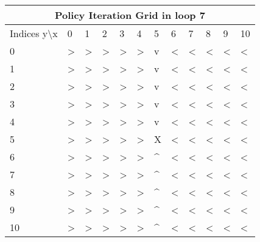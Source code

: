 \documentclass{article}
\begin{document}
\begin{center}
\begin{tabular}{ |l | l | l | l | l | l | l | l | l | l | l | l|}
\hline
\multicolumn{12}{|c|}{Policy Iteration Grid in loop 7}\\
\hline
Indices y\textbackslash x &0 & 1 & 2 & 3 & 4 & 5 & 6 & 7 & 8 & 9 & 10 \\ 

\hline
0 & \textgreater & \textgreater & \textgreater & \textgreater & \textgreater & v & \textless & \textless & \textless & \textless & \textless\\
1 & \textgreater & \textgreater & \textgreater & \textgreater & \textgreater & v & \textless & \textless & \textless & \textless & \textless\\
2 & \textgreater & \textgreater & \textgreater & \textgreater & \textgreater & v & \textless & \textless & \textless & \textless & \textless\\
3 & \textgreater & \textgreater & \textgreater & \textgreater & \textgreater & v & \textless & \textless & \textless & \textless & \textless\\
4 & \textgreater & \textgreater & \textgreater & \textgreater & \textgreater & v & \textless & \textless & \textless & \textless & \textless\\
5 & \textgreater & \textgreater & \textgreater & \textgreater & \textgreater & X & \textless & \textless & \textless & \textless & \textless\\
6 & \textgreater & \textgreater & \textgreater & \textgreater & \textgreater & \textasciicircum & \textless & \textless & \textless & \textless & \textless\\
7 & \textgreater & \textgreater & \textgreater & \textgreater & \textgreater & \textasciicircum & \textless & \textless & \textless & \textless & \textless\\
8 & \textgreater & \textgreater & \textgreater & \textgreater & \textgreater & \textasciicircum & \textless & \textless & \textless & \textless & \textless\\
9 & \textgreater & \textgreater & \textgreater & \textgreater & \textgreater & \textasciicircum & \textless & \textless & \textless & \textless & \textless\\
10 & \textgreater & \textgreater & \textgreater & \textgreater & \textgreater & \textasciicircum & \textless & \textless & \textless & \textless & \textless\\
\hline
\end{tabular}
\end{center}
\end{document}

